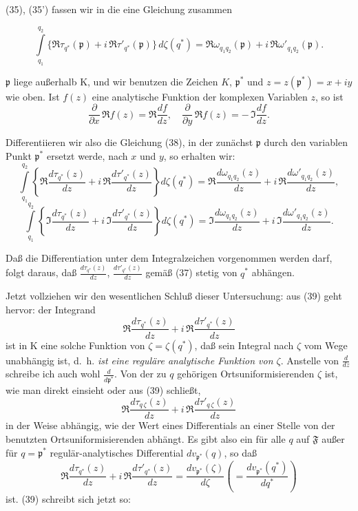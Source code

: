 \documentclass{article}
\begin{document}
(35), (35') fassen wir in die eine Gleichung zusammen

\[ \int\limits_{q_1}^{q_2} \{ \Re\tau_{q^*}(\mathfrak{p}) + i\,\Re\tau'_{q^*}(\mathfrak{p}) \} \, d\zeta(q^*) = \Re\omega_{q_1 q_2}(\mathfrak{p}) + i\,\Re\omega'_{q_1 q_2}(\mathfrak{p}). \tag{38} \]

$\mathfrak{p}$ liege außerhalb $\mathrm{K}$, und wir benutzen die Zeichen $K$, $\mathfrak{p}^*$ und $z = z(\mathfrak{p}^*) = x + iy$ wie oben. Ist $f(z)$ eine analytische Funktion der komplexen Variablen $z$, so ist
\[ \frac{\partial}{\partial x}\,\Re f(z) = \Re \frac{df}{dz}, \quad \frac{\partial}{\partial y}\,\Re f(z) = -\,\Im \frac{df}{dz}. \]

Differentiieren wir also die Gleichung (38), in der zunächst $\mathfrak{p}$ durch den variablen Punkt $\mathfrak{p}^*$ ersetzt werde, nach $x$ und $y$, so erhalten wir:
\[ \int\limits_{q_1}^{q_2} \left\{ \Re \frac{d\tau_{q^*}(z)}{dz} + i\,\Re \frac{d\tau'_{q^*}(z)}{dz} \right\} d\zeta(q^*) = \Re \frac{d\omega_{q_1 q_2}(z)}{dz} + i\,\Re \frac{d\omega'_{q_1 q_2}(z)}{dz}, \tag{39} \]
\[ \int\limits_{q_1}^{q_2} \left\{ \Im \frac{d\tau_{q^*}(z)}{dz} + i\,\Im \frac{d\tau'_{q^*}(z)}{dz} \right\} d\zeta(q^*) = \Im \frac{d\omega_{q_1 q_2}(z)}{dz} + i\,\Im \frac{d\omega'_{q_1 q_2}(z)}{dz}. \tag{39\,i} \]

Daß die Differentiation unter dem Integralzeichen vorgenommen werden darf, folgt daraus, daß $\frac{d\tau_{q^*}(z)}{dz}$, $\frac{d\tau'_{q^*}(z)}{dz}$ gemäß (37) stetig von $q^*$ abhängen.

Jetzt vollziehen wir den wesentlichen Schluß dieser Untersuchung: aus (39) geht hervor: der Integrand
\[ \Re \frac{d\tau_{q^*}(z)}{dz} + i\,\Re \frac{d\tau'_{q^*}(z)}{dz} \]
ist in $\mathrm{K}$ eine solche Funktion von $\zeta = \zeta(q^*)$, daß sein Integral nach $\zeta$ vom Wege unabhängig ist, d.~h. \emph{ist eine reguläre analytische Funktion von $\zeta$}. Anstelle von $\frac{d}{dz}$ schreibe ich auch wohl $\frac{d}{d\mathfrak{p}^*}$. Von der zu $q$ gehörigen Ortsuniformisierenden $\zeta$ ist, wie man direkt einsieht oder aus (39) schließt,
\[ \Re \frac{d\tau_{q\,\zeta}(z)}{dz} + i\,\Re \frac{d\tau'_{q\,\zeta}(z)}{dz} \]
in der Weise abhängig, wie der Wert eines Differentials an einer Stelle von der benutzten Ortsuniformisierenden abhängt. Es gibt also ein für alle $q$ auf $\mathfrak{F}$ außer für $q = \mathfrak{p}^*$ regulär-analytisches Differential $dv_{\mathfrak{p}^*}(q)$, so daß
\[ \Re \frac{d\tau_{q^*}(z)}{dz} + i\,\Re \frac{d\tau'_{q^*}(z)}{dz} = \frac{dv_{\mathfrak{p}^*}(\zeta)}{d\zeta} \left( = \frac{dv_{\mathfrak{p}^*}(q^*)}{dq^*} \right) \]
ist. (39) schreibt sich jetzt so:
\end{document}
